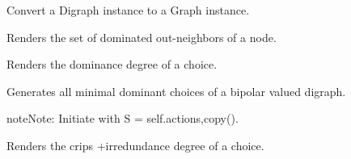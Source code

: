 \documentclass[letterpaper,10pt,english]{sphinxmanual}
\begin{document}
\begin{fulllineitems}
\begin{fulllineitems}
\end{fulllineitems}


\begin{fulllineitems}
\label{techDoc:digraphs.Digraph.digraph2Graph}
Convert a Digraph instance to a Graph instance.

\end{fulllineitems}


\begin{fulllineitems}
\label{techDoc:digraphs.Digraph.dneighbors}
Renders the set of dominated out-neighbors of a node.

\end{fulllineitems}


\begin{fulllineitems}
\label{techDoc:digraphs.Digraph.domin}
Renders the dominance degree of a choice.

\end{fulllineitems}


\begin{fulllineitems}
\label{techDoc:digraphs.Digraph.dominantChoices}
Generates all minimal dominant choices of a bipolar valued digraph.

\begin{notice}{note}{Note:}
Initiate with S = self.actions,copy().
\end{notice}

\end{fulllineitems}


\begin{fulllineitems}
\label{techDoc:digraphs.Digraph.domirred}
Renders the crips +irredundance degree of a choice.


\end{fulllineitems}
\end{fulllineitems}
\end{document}
